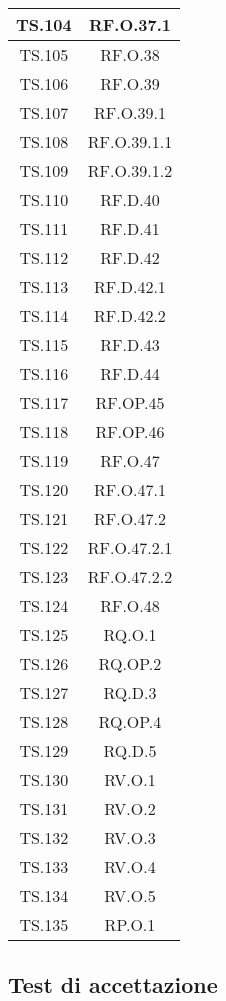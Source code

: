 {{{{{{{{{\begin{xltabular}{\textwidth}{|c|c|}
\hline
TS.104 & RF.O.37.1 \\
\hline
TS.105 & RF.O.38 \\
\hline
TS.106 & RF.O.39 \\
\hline
TS.107 & RF.O.39.1 \\
\hline
TS.108 & RF.O.39.1.1 \\
\hline
TS.109 & RF.O.39.1.2 \\
\hline
TS.110 & RF.D.40 \\
\hline
TS.111 & RF.D.41 \\
\hline
TS.112 & RF.D.42 \\
\hline
TS.113 & RF.D.42.1 \\
\hline
TS.114 & RF.D.42.2 \\
\hline
TS.115 & RF.D.43 \\
\hline
TS.116 & RF.D.44 \\
\hline
TS.117 & RF.OP.45 \\
\hline
TS.118 & RF.OP.46 \\
\hline
TS.119 & RF.O.47 \\
\hline
TS.120 & RF.O.47.1 \\
\hline
TS.121 & RF.O.47.2 \\
\hline
TS.122 & RF.O.47.2.1 \\
\hline
TS.123 & RF.O.47.2.2 \\
\hline
TS.124 & RF.O.48 \\
\hline
TS.125 & RQ.O.1 \\
\hline
TS.126 & RQ.OP.2 \\
\hline
TS.127 & RQ.D.3 \\
\hline
TS.128 & RQ.OP.4 \\
\hline
TS.129 & RQ.D.5 \\
\hline
TS.130 & RV.O.1 \\
\hline
TS.131 & RV.O.2 \\
\hline
TS.132 & RV.O.3 \\
\hline
TS.133 & RV.O.4 \\
\hline
TS.134 & RV.O.5 \\
\hline
TS.135 & RP.O.1 \\
\hline


    \end{xltabular}
    }

    

    
    \subsection{Test di accettazione}

}}}}}}}}
